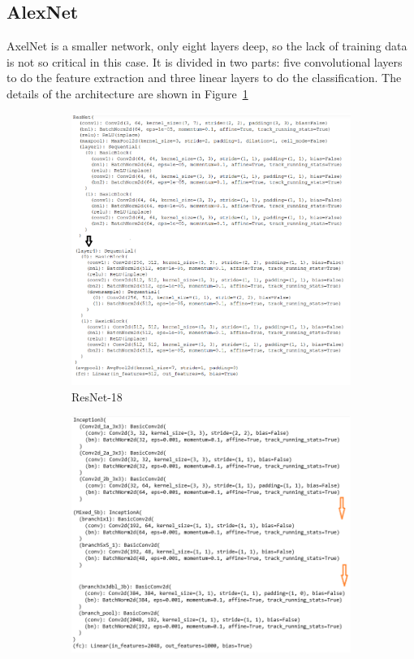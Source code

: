 \subsection{AlexNet}
AxelNet is a smaller network, only eight layers deep, so the lack of training data is not so critical in this case. It is divided in two parts: five convolutional layers to do the feature extraction and three linear layers to do the classification.  The details of the architecture are shown in Figure~\ref{fig:resarchi}
\begin{figure}
\begin{subfigure}{.5\textwidth}
  \centering
  \includegraphics[width=1\linewidth]{figures/03-Resnet_architecture.png}
  \caption{ResNet-18}
  \label{fig:resarchi}
\end{subfigure}%
\begin{subfigure}{.5\textwidth}
  \centering
  \includegraphics[width=1\linewidth]{figures/03-inception_architecture}

\end{subfigure}
\end{figure}
